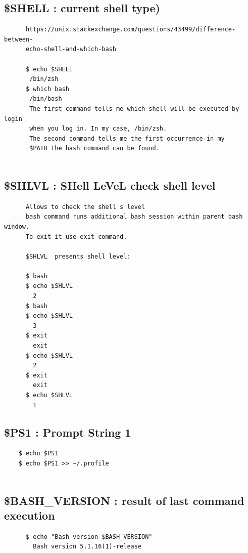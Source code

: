 \documentclass[a4paper,12pt]{article}
\begin{document}
\subsection{\$SHELL   : current shell type) }
\begin{verbatim}
      https://unix.stackexchange.com/questions/43499/difference-between-
      echo-shell-and-which-bash
      
      $ echo $SHELL
       /bin/zsh
      $ which bash
       /bin/bash
       The first command tells me which shell will be executed by login
       when you log in. In my case, /bin/zsh.
       The second command tells me the first occurrence in my
       $PATH the bash command can be found.


\end{verbatim}

\subsection{\$SHLVL : SHell LeVeL check shell level }
\begin{verbatim}
      Allows to check the shell's level
      bash command runs additional bash session within parent bash window. 
      To exit it use exit command.

      $SHLVL  presents shell level:
﻿
      $ bash
      $ echo $SHLVL
        2
      $ bash
      $ echo $SHLVL
        3
      $ exit
        exit
      $ echo $SHLVL
        2
      $ exit
        exit
      $ echo $SHLVL
        1
\end{verbatim}

\subsection{\$PS1 : Prompt String 1 }
\begin{verbatim}
    $ echo $PS1 
    $ echo $PS1 >> ~/.profile
    
\end{verbatim}




\subsection{\$BASH\_VERSION   : result of last command execution }

\begin{verbatim}
      $ echo "Bash version $BASH_VERSION"
        Bash version 5.1.16(1)-release
\end{verbatim}
\end{document}
